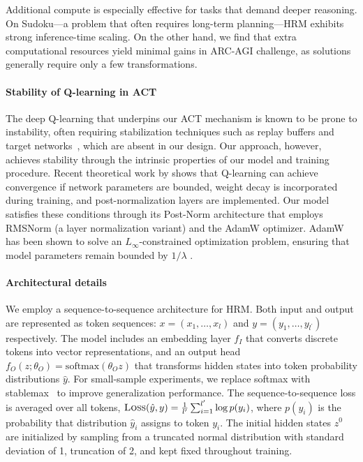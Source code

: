 Additional compute is especially effective for tasks that demand deeper reasoning. On Sudoku---a problem that often requires long-term planning---HRM exhibits strong inference-time scaling. On the other hand, we find that extra computational resources yield minimal gains in ARC-AGI challenge, as solutions generally require only a few transformations.

\paragraph{Stability of Q-learning in ACT}
The deep Q-learning that underpins our ACT mechanism is known to be prone to instability, often requiring stabilization techniques such as replay buffers and target networks~\citep{DQN}, which are absent in our design. Our approach, however, achieves stability through the intrinsic properties of our model and training procedure. Recent theoretical work by \citet{PQN2025} shows that Q-learning can achieve convergence if network parameters are bounded, weight decay is incorporated during training, and post-normalization layers are implemented.
Our model satisfies these conditions through its Post-Norm architecture that employs RMSNorm (a layer normalization variant) and the AdamW optimizer. AdamW has been shown to solve an $L_\infty$-constrained optimization problem, ensuring that model parameters remain bounded by $1/\lambda$ \citep{Xie2024ImplicitBO}.

\paragraph{Architectural details}
We employ a sequence-to-sequence architecture for HRM. Both input and output are represented as token sequences: $x = (x_1,\ldots,x_l)$ and $y = (y_1,\ldots,y_{l^\prime})$ respectively. The model includes an embedding layer $f_I$ that converts discrete tokens into vector representations, and an output head $f_O(z; \theta_O) = \text{softmax}(\theta_O z)$ that transforms hidden states into token probability distributions $\hat{y}$. For small-sample experiments, we replace softmax with stablemax~\cite{PBMB-2025} to improve generalization performance. The sequence-to-sequence loss is averaged over all tokens, $\textsc{Loss}(\hat{y}, y) = \frac{1}{l^\prime} \sum_{i=1}^{l^\prime}\log p(y_i)$, where $p(y_i)$ is the probability that distribution $\hat{y}_i$ assigns to token $y_i$. The initial hidden states $z^0$ are initialized by sampling from a truncated normal distribution with standard deviation of 1, truncation of 2, and kept fixed throughout training.

